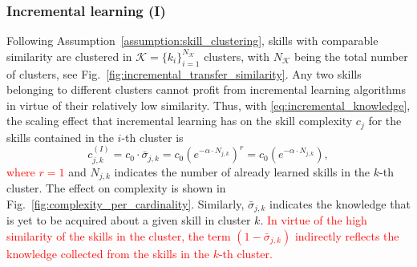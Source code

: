 \subsubsection{\textbf{Incremental learning (I)}}
Following Assumption~\ref{assumption:skill_clustering}, skills with comparable similarity are clustered in $\mathcal{K} = \lbrace k_i \rbrace^{N_\mathcal{K}}_{i=1} $ clusters, with $N_\mathcal{K}$ being the total number of clusters, see Fig.~\ref{fig:incremental_transfer_similarity}. Any two skills belonging to different clusters cannot profit from incremental learning algorithms in virtue of their relatively low similarity. Thus, with \eqref{eq:incremental_knowledge}, the scaling effect that incremental learning has on the skill complexity $c_j$ for the skills contained in the $i$-th cluster is
\begin{equation}\label{eq:complexity_IL}
	c^{(I)}_{j,k} = c_0 \cdot \bar{\sigma}_{j,k} = c_0 \left( e^{-\alpha \cdot {N_{j,k}}}\right)^r = c_0 \left( e^{-\alpha \cdot {N_{j,k}}}\right),
\end{equation}
\textcolor{red}{where $r=1$} and ${N_{j,k}}$ indicates the number of already learned skills in the $k$-th cluster. The effect on complexity is shown in Fig.~\ref{fig:complexity_per_cardinality}. Similarly, $\bar{\sigma}_{j,k}$ indicates the knowledge that is yet to be acquired about a given skill in cluster $k$. \textcolor{red}{In virtue of the high similarity of the skills in the cluster, the term $\left(1-\bar{\sigma}_{j,k}\right)$ indirectly reflects the knowledge collected from the skills in the $k$-th cluster.}

